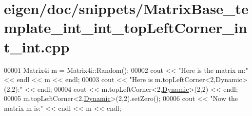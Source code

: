 \hypertarget{eigen_2doc_2snippets_2_matrix_base__template__int__int__top_left_corner__int__int_8cpp_source}{}\section{eigen/doc/snippets/\+Matrix\+Base\+\_\+template\+\_\+int\+\_\+int\+\_\+top\+Left\+Corner\+\_\+int\+\_\+int.cpp}
\label{eigen_2doc_2snippets_2_matrix_base__template__int__int__top_left_corner__int__int_8cpp_source}

\begin{DoxyCode}
00001 Matrix4i m = Matrix4i::Random();
00002 cout << \textcolor{stringliteral}{"Here is the matrix m:"} << endl << m << endl;
00003 cout << \textcolor{stringliteral}{"Here is m.topLeftCorner<2,Dynamic>(2,2):"} << endl;
00004 cout << m.topLeftCorner<2,\hyperlink{namespace_eigen_ad81fa7195215a0ce30017dfac309f0b2}{Dynamic}>(2,2) << endl;
00005 m.topLeftCorner<2,\hyperlink{namespace_eigen_ad81fa7195215a0ce30017dfac309f0b2}{Dynamic}>(2,2).setZero();
00006 cout << \textcolor{stringliteral}{"Now the matrix m is:"} << endl << m << endl;
\end{DoxyCode}
